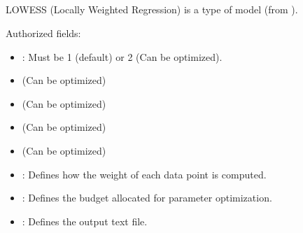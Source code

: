 \documentclass[letterpaper,10pt,english]{sphinxmanual}
\begin{document}
\subsection{}
\label{\detokenize{SgteLib:lowess}}\label{\detokenize{SgteLib:id7}}
\begin{DUlineblock}{0em}
\item[] LOWESS (Locally Weighted Regression) is a type of model (from ).
\item[] Authorized fields:
\end{DUlineblock}
\begin{itemize}
\item {} 
\sphinxAtStartPar
{\hyperref[\detokenize{SgteLib:degree}]{}}: Must be 1 (default) or 2 (Can be optimized).

\item {} 
\sphinxAtStartPar
{\hyperref[\detokenize{SgteLib:ridge}]{}} (Can be optimized)

\item {} 
\sphinxAtStartPar
{\hyperref[\detokenize{SgteLib:kernel-type}]{}} (Can be optimized)

\item {} 
\sphinxAtStartPar
{\hyperref[\detokenize{SgteLib:kernel-shape}]{}} (Can be optimized)

\item {} 
\sphinxAtStartPar
{\hyperref[\detokenize{SgteLib:distance-type}]{}} (Can be optimized)

\item {} 
\sphinxAtStartPar
{\hyperref[\detokenize{SgteLib:preset}]{}}: Defines how the weight of each data point is computed.

\item {} 
\sphinxAtStartPar
{\hyperref[\detokenize{SgteLib:budget}]{}}: Defines the budget allocated for parameter optimization.

\item {} 
\sphinxAtStartPar
{\hyperref[\detokenize{SgteLib:output}]{}}: Defines the output text file.

\end{itemize}
\end{document}
